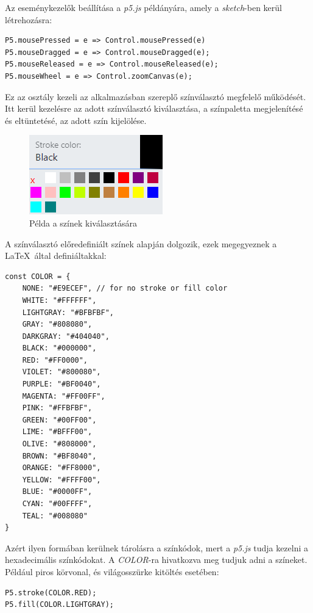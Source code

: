 Az eseménykezelők beállítása a \textit{p5.js} példányára, amely a \textit{sketch}-ben kerül létrehozásra:

\begin{lstlisting}[style=es6, morekeywords={P5, Control}]
P5.mousePressed = e => Control.mousePressed(e)
P5.mouseDragged = e => Control.mouseDragged(e);
P5.mouseReleased = e => Control.mouseReleased(e);
P5.mouseWheel = e => Control.zoomCanvas(e);
\end{lstlisting}


Ez az osztály kezeli az alkalmazásban szereplő színválasztó megfelelő működését. Itt kerül kezelésre az adott színválasztó kiválasztása, a színpaletta megjelenítésé és eltüntetésé, az adott szín kijelölése. 

\begin{figure}[!h]
	\centering
	\label{fig:cp2}
	\includegraphics[]{images/colorpicker.png}
	\caption{Példa a színek kiválasztására}
\end{figure}

A színválasztó előredefiniált színek alapján dolgozik, ezek megegyeznek a \LaTeX\ által definiáltakkal:

\begin{lstlisting}[style=es6]
const COLOR = {
	NONE: "#E9ECEF", // for no stroke or fill color
	WHITE: "#FFFFFF",
	LIGHTGRAY: "#BFBFBF",
	GRAY: "#808080",
	DARKGRAY: "#404040",
	BLACK: "#000000",
	RED: "#FF0000",
	VIOLET: "#800080",
	PURPLE: "#BF0040",
	MAGENTA: "#FF00FF",
	PINK: "#FFBFBF",
	GREEN: "#00FF00",
	LIME: "#BFFF00",
	OLIVE: "#808000",
	BROWN: "#BF8040",
	ORANGE: "#FF8000",
	YELLOW: "#FFFF00",
	BLUE: "#0000FF",
	CYAN: "#00FFFF",
	TEAL: "#008080"
}
\end{lstlisting}

Azért ilyen formában kerülnek tárolásra a színkódok, mert a \textit{p5.js} tudja kezelni a hexadecimális színkódokat. A \textit{COLOR}-ra hivatkozva meg tudjuk adni a színeket. Például piros körvonal, és világosszürke kitöltés esetében:
\begin{lstlisting}[style=es6, morekeywords={P5, COLOR}]
P5.stroke(COLOR.RED);
P5.fill(COLOR.LIGHTGRAY);
\end{lstlisting}

